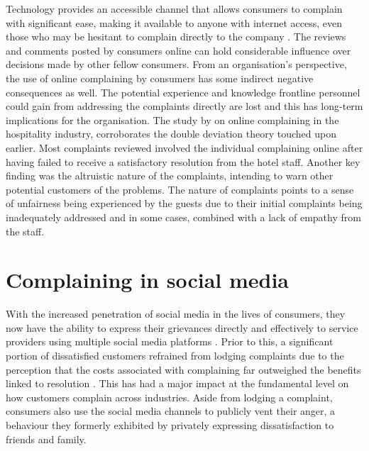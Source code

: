 \newline \newline
Technology provides an accessible channel that allows consumers to complain with significant ease, making it available to anyone with internet access, even those who may be hesitant to complain directly to the company \cite{sparksComplainingCyberspaceMotives2010}. The reviews and comments posted by consumers online can hold considerable influence over decisions made by other fellow consumers. From an organisation's perspective, the use of online complaining by consumers has some indirect negative consequences as well. The potential experience and knowledge frontline personnel could gain from addressing the complaints directly are lost and this has long-term implications for the organisation. The study by \cite{sparksComplainingCyberspaceMotives2010} on online complaining in the hospitality industry, corroborates the double deviation theory touched upon earlier. Most complaints reviewed involved the individual complaining online after having failed to receive a satisfactory resolution from the hotel staff. Another key finding was the altruistic nature of the complaints, intending to warn other potential customers of the problems. The nature of complaints points to a sense of unfairness being experienced by the guests due to their initial complaints being inadequately addressed and in some cases, combined with a lack of empathy from the staff.

\section{Complaining in social media}
With the increased penetration of social media in the lives of consumers, they now have the ability to express their grievances directly and effectively to service providers using multiple social media platforms \cite{balaji_customer_2015}. Prior to this, a significant portion of dissatisfied customers refrained from lodging complaints due to the perception that the costs associated with complaining far outweighed the benefits linked to resolution \cite{sharma_complainers_2010}. This has had a major impact at the fundamental level on how customers complain across industries. Aside from lodging a complaint, consumers also use the social media channels to publicly vent their anger, a behaviour they formerly exhibited by privately expressing dissatisfaction to friends and family.\\

